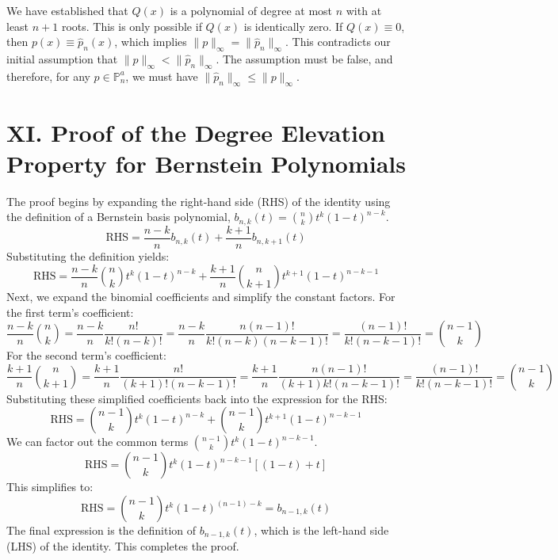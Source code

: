 \documentclass[a4paper]{article}
\begin{document}
We have established that $Q(x)$ is a polynomial of degree at most $n$ with at least $n+1$ roots. This is only possible if $Q(x)$ is identically zero.
If $Q(x) \equiv 0$, then $p(x) \equiv \hat{p}_n(x)$, which implies $\|p\|_{\infty} = \|\hat{p}_n\|_{\infty}$. This contradicts our initial assumption that $\|p\|_{\infty} < \|\hat{p}_n\|_{\infty}$.
The assumption must be false, and therefore, for any $p \in \mathbb{P}_n^a$, we must have $\|\hat{p}_n\|_{\infty} \le \|p\|_{\infty}$.


\section*{XI. Proof of the Degree Elevation Property for Bernstein Polynomials}

The proof begins by expanding the right-hand side (RHS) of the identity using the definition of a Bernstein basis polynomial, $b_{n,k}(t) = \binom{n}{k}t^k(1-t)^{n-k}$.
\[
\text{RHS} = \frac{n-k}{n}b_{n,k}(t) + \frac{k+1}{n}b_{n,k+1}(t)
\]
Substituting the definition yields:
\[
\text{RHS} = \frac{n-k}{n}\binom{n}{k}t^k(1-t)^{n-k} + \frac{k+1}{n}\binom{n}{k+1}t^{k+1}(1-t)^{n-k-1}
\]
Next, we expand the binomial coefficients and simplify the constant factors.
For the first term's coefficient:
\[
\frac{n-k}{n}\binom{n}{k} = \frac{n-k}{n} \frac{n!}{k!(n-k)!} = \frac{n-k}{n} \frac{n(n-1)!}{k!(n-k)(n-k-1)!} = \frac{(n-1)!}{k!(n-k-1)!} = \binom{n-1}{k}
\]
For the second term's coefficient:
\[
\frac{k+1}{n}\binom{n}{k+1} = \frac{k+1}{n} \frac{n!}{(k+1)!(n-k-1)!} = \frac{k+1}{n} \frac{n(n-1)!}{(k+1)k!(n-k-1)!} = \frac{(n-1)!}{k!(n-k-1)!} = \binom{n-1}{k}
\]
Substituting these simplified coefficients back into the expression for the RHS:
\[
\text{RHS} = \binom{n-1}{k}t^k(1-t)^{n-k} + \binom{n-1}{k}t^{k+1}(1-t)^{n-k-1}
\]
We can factor out the common terms $\binom{n-1}{k}t^k(1-t)^{n-k-1}$.
\[
\text{RHS} = \binom{n-1}{k}t^k(1-t)^{n-k-1} \left[ (1-t) + t \right]
\]
This simplifies to:
\[
\text{RHS} = \binom{n-1}{k}t^k(1-t)^{(n-1)-k} = b_{n-1,k}(t)
\]
The final expression is the definition of $b_{n-1,k}(t)$, which is the left-hand side (LHS) of the identity. This completes the proof.
\end{document}
